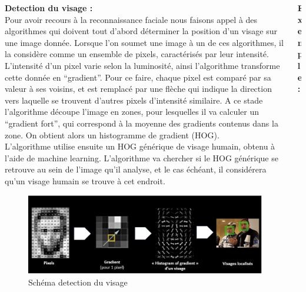 \documentclass{beamer}
\begin{document}
\begin{columns}[c]
	
	\begin{column}{.46\textwidth}
	\color{blancCreme}
	{\bf Detection du visage :}\\
     Pour avoir recours à la reconnaissance faciale nous faisons appel à des algorithmes qui doivent tout d’abord déterminer la position d’un visage sur une image donnée. Lorsque l’on soumet une image à un de ces algorithmes, il la considère comme un ensemble de pixels, caractérisés par leur intensité. L’intensité d’un pixel varie selon la luminosité,  ainsi l’algorithme transforme cette donnée en “gradient”. Pour ce faire, chaque pixel est comparé par sa valeur à ses voisins, et est remplacé par une flèche qui indique la direction vers laquelle se trouvent d’autres pixels d’intensité similaire. A ce stade l’algorithme découpe l’image en zones, pour lesquelles il va calculer un “gradient fort”, qui correspond à la moyenne des gradients contenus dans la zone. On obtient alors un histogramme de gradient (HOG). \\
L’algorithme utilise ensuite un HOG générique de visage humain, obtenu  à l’aide de machine learning. L’algorithme va chercher si le HOG générique se retrouve au sein de l’image qu’il analyse, et le cas échéant, il considérera qu’un visage humain se trouve à cet endroit. 
\par

	\begin{figure}
	\color{blancCreme}
		\caption{Schéma detection du visage}
		\includegraphics[width=40cm]{Localise.jpg} \par	
		\hrulefill
	\end{figure}	
	\end{column}

	\begin{column}{.4\textwidth}
	\color{blancCreme}
	{\bf Exemple:}\\
		

\end{column}
\end{columns}
\end{document}
